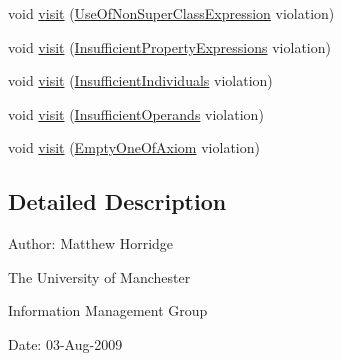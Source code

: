 \begin{DoxyCompactItemize}
void \hyperlink{interfaceorg_1_1semanticweb_1_1owlapi_1_1profiles_1_1_o_w_l2_r_l_profile_violation_visitor_a0a27dbe0f45c7b81b6f9863988db1b57}{visit} (\hyperlink{classorg_1_1semanticweb_1_1owlapi_1_1profiles_1_1_use_of_non_super_class_expression}{Use\-Of\-Non\-Super\-Class\-Expression} violation)
\item 
void \hyperlink{interfaceorg_1_1semanticweb_1_1owlapi_1_1profiles_1_1_o_w_l2_r_l_profile_violation_visitor_a49ee6251084a06a941f91e213527dd27}{visit} (\hyperlink{classorg_1_1semanticweb_1_1owlapi_1_1profiles_1_1_insufficient_property_expressions}{Insufficient\-Property\-Expressions} violation)
\item 
void \hyperlink{interfaceorg_1_1semanticweb_1_1owlapi_1_1profiles_1_1_o_w_l2_r_l_profile_violation_visitor_a26ad30c1b15223cc3c04b74dff3c984b}{visit} (\hyperlink{classorg_1_1semanticweb_1_1owlapi_1_1profiles_1_1_insufficient_individuals}{Insufficient\-Individuals} violation)
\item 
void \hyperlink{interfaceorg_1_1semanticweb_1_1owlapi_1_1profiles_1_1_o_w_l2_r_l_profile_violation_visitor_afb984280201b69e8b1126f93286c3a37}{visit} (\hyperlink{classorg_1_1semanticweb_1_1owlapi_1_1profiles_1_1_insufficient_operands}{Insufficient\-Operands} violation)
\item 
void \hyperlink{interfaceorg_1_1semanticweb_1_1owlapi_1_1profiles_1_1_o_w_l2_r_l_profile_violation_visitor_a01c46251b33fbcceba8b5dd718297226}{visit} (\hyperlink{classorg_1_1semanticweb_1_1owlapi_1_1profiles_1_1_empty_one_of_axiom}{Empty\-One\-Of\-Axiom} violation)
\end{DoxyCompactItemize}


\subsection{Detailed Description}
Author\-: Matthew Horridge\par
 The University of Manchester\par
 Information Management Group\par
 Date\-: 03-\/\-Aug-\/2009 

